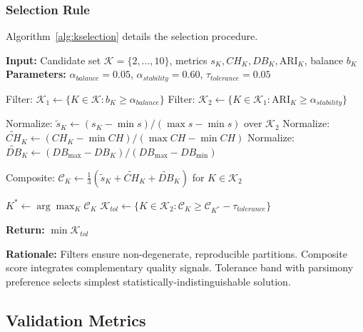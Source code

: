 \documentclass[11pt,a4paper]{article}
\begin{document}
\subsubsection{Selection Rule}

Algorithm~\ref{alg:kselection} details the selection procedure.

\begin{algorithm}[h]
\caption{Evidence-Based K Selection}
\label{alg:kselection}
\begin{algorithmic}[1]
\State \textbf{Input:} Candidate set $\mathcal{K} = \{2, \ldots, 10\}$, metrics $s_K, CH_K, DB_K, \text{ARI}_K$, balance $b_K$
\State \textbf{Parameters:} $\alpha_{balance} = 0.05$, $\alpha_{stability} = 0.60$, $\tau_{tolerance} = 0.05$

\State Filter: $\mathcal{K}_1 \leftarrow \{K \in \mathcal{K} : b_K \geq \alpha_{balance}\}$ 
\State Filter: $\mathcal{K}_2 \leftarrow \{K \in \mathcal{K}_1 : \text{ARI}_K \geq \alpha_{stability}\}$ 

\State Normalize: $\tilde{s}_K \leftarrow (s_K - \min s) / (\max s - \min s)$ over $\mathcal{K}_2$
\State Normalize: $\tilde{CH}_K \leftarrow (CH_K - \min CH) / (\max CH - \min CH)$
\State Normalize: $\tilde{DB}_K \leftarrow (DB_{\max} - DB_K) / (DB_{\max} - DB_{\min})$ 

\State Composite: $\mathcal{C}_K \leftarrow \frac{1}{3}(\tilde{s}_K + \tilde{CH}_K + \tilde{DB}_K)$ for $K \in \mathcal{K}_2$

\State $K^* \leftarrow \arg\max_{K} \mathcal{C}_K$
\State $\mathcal{K}_{tol} \leftarrow \{K \in \mathcal{K}_2 : \mathcal{C}_K \geq \mathcal{C}_{K^*} - \tau_{tolerance}\}$ 

\State \textbf{Return:} $\min \mathcal{K}_{tol}$ 
\end{algorithmic}
\end{algorithm}

\textbf{Rationale:} Filters ensure non-degenerate, reproducible partitions. Composite score integrates complementary quality signals. Tolerance band with parsimony preference selects simplest statistically-indistinguishable solution.

\subsection{Validation Metrics}
\label{sec:validation}
\end{document}
